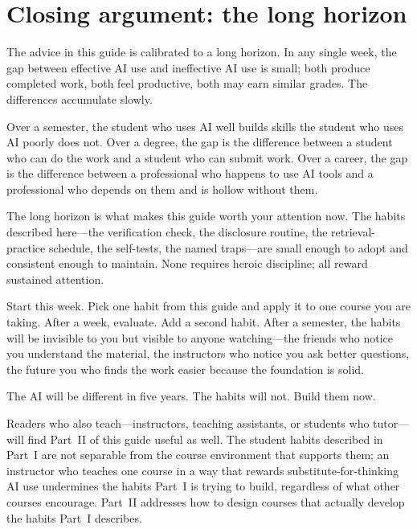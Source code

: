 \documentclass[11pt]{book}
\begin{document}
\section{Closing argument: the long horizon}

The advice in this guide is calibrated to a long horizon. In any single week, the gap between effective AI use and ineffective AI use is small; both produce completed work, both feel productive, both may earn similar grades. The differences accumulate slowly.

Over a semester, the student who uses AI well builds skills the student who uses AI poorly does not. Over a degree, the gap is the difference between a student who can do the work and a student who can submit work. Over a career, the gap is the difference between a professional who happens to use AI tools and a professional who depends on them and is hollow without them.

The long horizon is what makes this guide worth your attention now. The habits described here---the verification check, the disclosure routine, the retrieval-practice schedule, the self-tests, the named traps---are small enough to adopt and consistent enough to maintain. None requires heroic discipline; all reward sustained attention.

Start this week. Pick one habit from this guide and apply it to one course you are taking. After a week, evaluate. Add a second habit. After a semester, the habits will be invisible to you but visible to anyone watching---the friends who notice you understand the material, the instructors who notice you ask better questions, the future you who finds the work easier because the foundation is solid.

The AI will be different in five years. The habits will not. Build them now.

Readers who also teach---instructors, teaching assistants, or students who tutor---will find Part~II of this guide useful as well. The student habits described in Part~I are not separable from the course environment that supports them; an instructor who teaches one course in a way that rewards substitute-for-thinking AI use undermines the habits Part~I is trying to build, regardless of what other courses encourage. Part~II addresses how to design courses that actually develop the habits Part~I describes.

\end{document}
